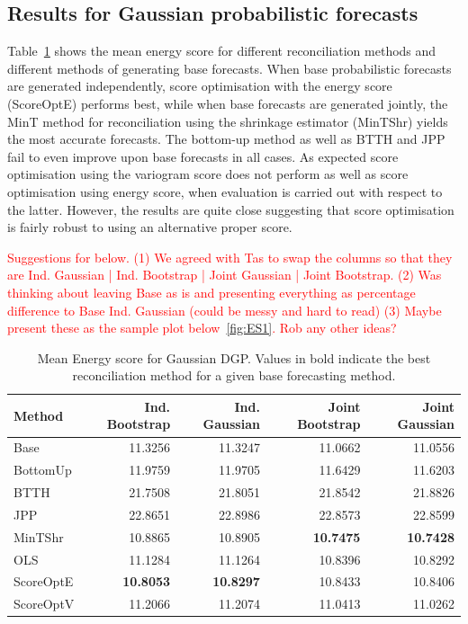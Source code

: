 \documentclass[11pt]{article}
\theoremstyle{definition}
\begin{document}
\subsection{Results for Gaussian probabilistic forecasts}\label{sec:SimAnalysticalResults}

Table~\ref{tab:gse} shows the mean energy score for different reconciliation methods and different methods of generating base forecasts. When base probabilistic forecasts are generated independently, score optimisation with the energy score (ScoreOptE) performs best, while when base forecasts are generated jointly, the MinT method for reconciliation using the shrinkage estimator (MinTShr) yields the most accurate forecasts. The bottom-up method as well as BTTH and JPP fail to even improve upon base forecasts in all cases. As expected score optimisation using the variogram score does not perform as well as score optimisation using energy score, when evaluation is carried out with respect to the latter. However, the results are quite close suggesting that score optimisation is fairly robust to using an alternative proper score.

\textcolor{red}{Suggestions for below. (1) We agreed with Tas to swap the columns so that they are Ind. Gaussian | Ind. Bootstrap | Joint Gaussian | Joint Bootstrap. (2) Was thinking about leaving Base as is and presenting everything as percentage difference to Base Ind. Gaussian (could be messy and hard to read) (3) Maybe present these as the sample plot below~\ref{fig:ES1}. Rob any other ideas?}

\begin{table}[H]
	\footnotesize
	\caption{\label{tab:gse}Mean Energy score for Gaussian DGP\@. Values in bold indicate the best reconciliation method for a given base forecasting method.}
	\centering
	\begin{tabular}[t]{lrrrr}
		\toprule
		Method    & Ind. Bootstrap   & Ind. Gaussian    & Joint Bootstrap  & Joint Gaussian\\
		\midrule
    Base      & 11.3256          & 11.3247          & 11.0662          & 11.0556\\
    BottomUp  & 11.9759          & 11.9705          & 11.6429          & 11.6203\\
    BTTH      & 21.7508          & 21.8051          & 21.8542          & 21.8826\\
    JPP       & 22.8651          & 22.8986          & 22.8573          & 22.8599\\
    MinTShr   & 10.8865          & 10.8905          & \textbf{10.7475} & \textbf{10.7428}\\
    OLS       & 11.1284          & 11.1264          & 10.8396          & 10.8292\\
    ScoreOptE & \textbf{10.8053} & \textbf{10.8297} & 10.8433          & 10.8406\\
    ScoreOptV & 11.2066          & 11.2074          & 11.0413          & 11.0262\\
		\bottomrule
	\end{tabular}
\end{table}
\end{document}
